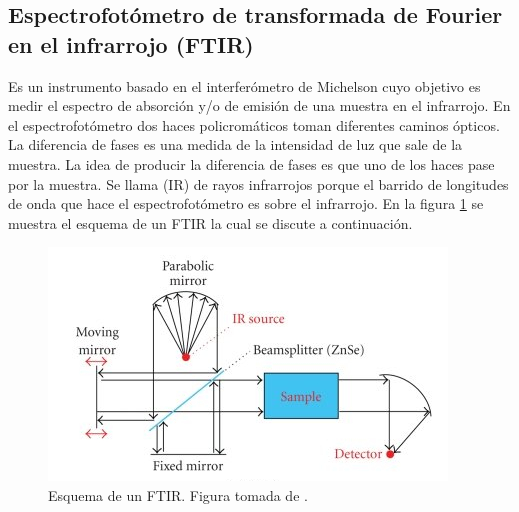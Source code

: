 \documentclass[%
 reprint,
 amsmath,amssymb,
 aps,
]{revtex4-1}
\begin{document}
\subsection{Espectrofotómetro de transformada de Fourier en el infrarrojo (FTIR)}
Es un instrumento basado en el interferómetro de Michelson cuyo objetivo es medir el espectro de absorción y/o de emisión de una muestra en el infrarrojo. En el espectrofotómetro dos haces policromáticos  toman diferentes caminos ópticos. La diferencia de fases es una medida de la intensidad de luz que sale de la muestra. La idea de producir la diferencia de fases es que uno de los haces pase por la muestra. Se llama (IR) de rayos infrarrojos porque el barrido de longitudes de onda que hace el espectrofotómetro es sobre el infrarrojo.
En la figura \ref{fig:FTIR} se muestra el esquema de un FTIR la cual se discute a continuación.
\begin{figure}[h]
  \includegraphics[width=\linewidth]{FTIR.jpg}
  \caption{Esquema de un FTIR. Figura tomada de \cite{Downes2010}.}
  \label{fig:FTIR}
\end{figure}
\end{document}

